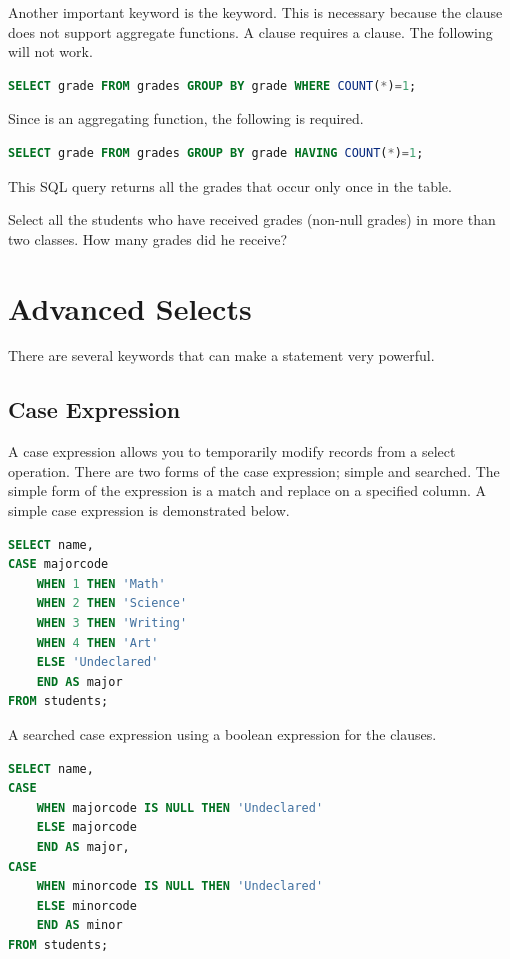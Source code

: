 Another important keyword is the  keyword.
This is necessary because the  clause does not support aggregate functions.
A  clause requires a  clause.
The following will not work.
\begin{lstlisting}[language=SQL]
SELECT grade FROM grades GROUP BY grade WHERE COUNT(*)=1;
\end{lstlisting}
Since  is an aggregating function, the following is required.
\begin{lstlisting}[language=SQL]
SELECT grade FROM grades GROUP BY grade HAVING COUNT(*)=1;
\end{lstlisting}
This SQL query returns all the grades that occur only once in the table.

\begin{problem}
Select all the students who have received grades (non-null grades) in more than two classes.  How many grades did he receive?
\label{prob:manygrades}
\end{problem}

\section*{Advanced Selects}
There are several keywords that can make a  statement very powerful.

\subsection*{Case Expression}
A case expression allows you to temporarily modify records from a select operation.
There are two forms of the case expression; simple and searched.
The simple form of the expression is a match and replace on a specified column.
A simple case expression is demonstrated below.
\begin{lstlisting}[language=SQL]
SELECT name, 
CASE majorcode 
    WHEN 1 THEN 'Math' 
    WHEN 2 THEN 'Science' 
    WHEN 3 THEN 'Writing' 
    WHEN 4 THEN 'Art' 
    ELSE 'Undeclared' 
    END AS major
FROM students;
\end{lstlisting}

A searched case expression using a boolean expression for the  clauses.
\begin{lstlisting}[language=SQL]
SELECT name, 
CASE 
    WHEN majorcode IS NULL THEN 'Undeclared' 
    ELSE majorcode 
    END AS major, 
CASE 
    WHEN minorcode IS NULL THEN 'Undeclared' 
    ELSE minorcode 
    END AS minor 
FROM students;
\end{lstlisting}

